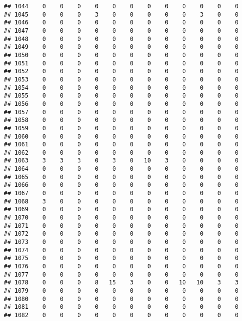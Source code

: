\documentclass[]{article}
\begin{document}
\begin{verbatim}
## 1044    0    0    0    0    0    0    0    0    0    0    0    0
## 1045    0    0    0    3    0    0    0    0    0    3    0    0
## 1046    0    0    0    0    0    0    0    0    0    0    0    0
## 1047    0    0    0    0    0    0    0    0    0    0    0    0
## 1048    0    0    0    0    0    0    0    0    0    0    0    0
## 1049    0    0    0    0    0    0    0    0    0    0    0    0
## 1050    0    0    0    0    0    0    0    0    0    0    0    0
## 1051    0    0    0    0    0    0    0    0    0    0    0    0
## 1052    0    0    0    0    0    0    0    0    0    0    0    0
## 1053    0    0    0    0    0    0    0    0    0    0    0    0
## 1054    0    0    0    0    0    0    0    0    0    0    0    0
## 1055    0    0    0    0    0    0    0    0    0    0    0    0
## 1056    0    0    0    0    0    0    0    0    0    0    0    0
## 1057    0    0    0    0    0    0    0    0    0    0    0    0
## 1058    0    0    0    0    0    0    0    0    0    0    0    0
## 1059    0    0    0    0    0    0    0    0    0    0    0    0
## 1060    0    0    0    0    0    0    0    0    0    0    0    0
## 1061    0    0    0    0    0    0    0    0    0    0    0    0
## 1062    0    0    0    0    0    0    0    0    0    0    0    0
## 1063    3    3    3    0    3    0   10    3    0    0    0    0
## 1064    0    0    0    0    0    0    0    0    0    0    0    0
## 1065    0    0    0    0    0    0    0    0    0    0    0    0
## 1066    0    0    0    0    0    0    0    0    0    0    0    0
## 1067    0    0    0    0    0    0    0    0    0    0    0    0
## 1068    3    0    0    0    0    0    0    0    0    0    0    0
## 1069    0    0    0    0    0    0    0    0    0    0    0    0
## 1070    0    0    0    0    0    0    0    0    0    0    0    0
## 1071    0    0    0    0    0    0    0    0    0    0    0    0
## 1072    0    0    0    0    0    0    0    0    0    0    0    0
## 1073    0    0    0    0    0    0    0    0    0    0    0    0
## 1074    0    0    0    0    0    0    0    0    0    0    0    0
## 1075    0    0    0    0    0    0    0    0    0    0    0    0
## 1076    0    0    0    0    0    0    0    0    0    0    0    0
## 1077    0    0    0    0    0    0    0    0    0    0    0    0
## 1078    0    0    0    8   15    3    0    0   10   10    3    3
## 1079    0    0    0    0    0    0    0    0    0    0    0    0
## 1080    0    0    0    0    0    0    0    0    0    0    0    0
## 1081    0    0    0    0    0    0    0    0    0    0    0    0
## 1082    0    0    0    0    0    0    0    0    0    0    0    0

\end{verbatim}
\end{document}
